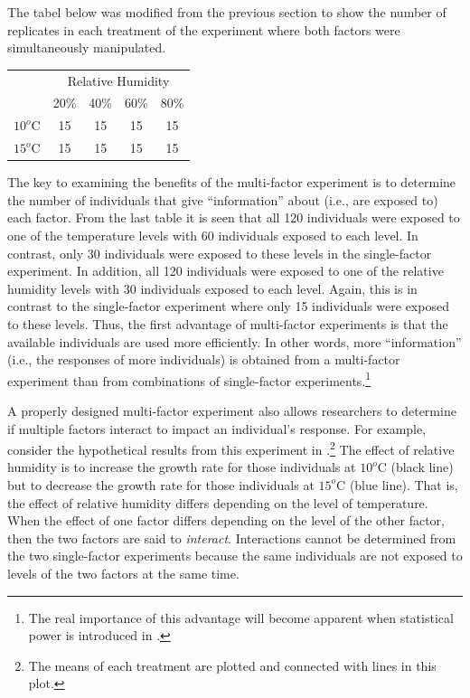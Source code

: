 \documentclass[10pt,openany]{book}\usepackage[]{graphicx}\usepackage[]{color}
\begin{document}
The tabel below was modified from the previous section to show the number of replicates in each treatment of the experiment where both factors were simultaneously manipulated.

\begin{center}
\begin{tabular}{cc|c|c|c}
 & \multicolumn{4}{c}{Relative Humidity} \\
\cline{2-5}
 & 20\% & 40\% & 60\% & 80\% \\
\cline{2-5}
\multicolumn{1}{c|}{$10^{o}$C} & 15 & 15 & 15 & \multicolumn{1}{c|}{15} \\
\hline
\multicolumn{1}{c|}{$15^{o}$C} & 15 & 15 & 15 & \multicolumn{1}{c|}{15} \\
\cline{2-5}
\end{tabular}
\end{center}

The key to examining the benefits of the multi-factor experiment is to determine the number of individuals that give ``information'' about (i.e., are exposed to) each factor. From the last table it is seen that all 120 individuals were exposed to one of the temperature levels with 60 individuals exposed to each level. In contrast, only 30 individuals were exposed to these levels in the single-factor experiment. In addition, all 120 individuals were exposed to one of the relative humidity levels with 30 individuals exposed to each level. Again, this is in contrast to the single-factor experiment where only 15 individuals were exposed to these levels. Thus, the first advantage of multi-factor experiments is that the available individuals are used more efficiently. In other words, more ``information'' (i.e., the responses of more individuals) is obtained from a multi-factor experiment than from combinations of single-factor experiments.\footnote{The real importance of this advantage will become apparent when statistical power is introduced in .}

A properly designed multi-factor experiment also allows researchers to determine if multiple factors interact to impact an individual's response. For example, consider the hypothetical results from this experiment in .\footnote{The means of each treatment are plotted and connected with lines in this plot.} The effect of relative humidity is to increase the growth rate for those individuals at $10^{o}$C (black line) but to decrease the growth rate for those individuals at $15^{o}$C (blue line). That is, the effect of relative humidity differs depending on the level of temperature. When the effect of one factor differs depending on the level of the other factor, then the two factors are said to \textit{interact}. Interactions cannot be determined from the two single-factor experiments because the same individuals are not exposed to levels of the two factors at the same time.
\end{document}
